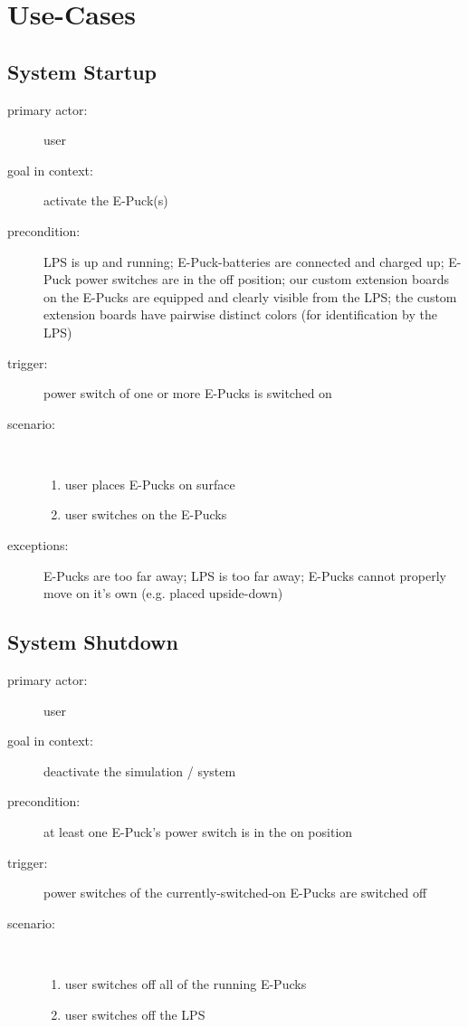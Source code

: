 \documentclass[a4paper,parskip,headheight=38pt]{scrartcl} %
\begin{document}
\section{Use-Cases}
\subsection{System Startup}
\begin{description}
\item[primary actor:] user
\item[goal in context:] activate the E-Puck(s)
\item[precondition:] LPS is up and running; E-Puck-batteries are connected and charged up;
  E-Puck power switches are in the off position; our custom extension boards on the E-Pucks
  are equipped and clearly visible from the LPS; the custom extension boards have
  pairwise distinct colors (for identification by the LPS)
\item[trigger:] power switch of one or more E-Pucks is switched on
\item[scenario:] \ 
\begin{enumerate}
	\item user places E-Pucks on surface
	\item user switches on the E-Pucks
\end{enumerate}
\item[exceptions:] E-Pucks are too far away; LPS is too far away; E-Pucks cannot properly move on it's own (e.g. placed upside-down)
\end{description}

\subsection{System Shutdown}
\begin{description}
\item[primary actor:] user
\item[goal in context:] deactivate the simulation / system
\item[precondition:] at least one E-Puck's power switch is in the on position
\item[trigger:] power switches of the currently-switched-on E-Pucks are switched off
\item[scenario:] \ 
\begin{enumerate}
	\item user switches off all of the running E-Pucks
	\item user switches off the LPS
\end{enumerate}
\end{description}
\end{document}
